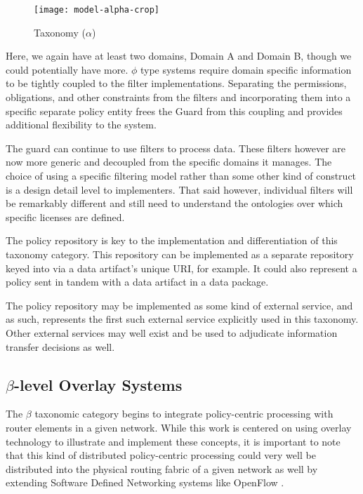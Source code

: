 \begin{figure}[!t]
\centering
\texttt{[image: model-alpha-crop]}
\caption{Taxonomy ($\alpha$)}
\label{fig:model:taxonomy-alpha}
\end{figure}

Here, we again have at least two domains, Domain A and Domain B, though we could potentially have more.  $\phi$ type systems require domain specific information to be tightly coupled to the filter implementations.  Separating the permissions, obligations, and other constraints from the filters and incorporating them into a specific separate policy entity frees the Guard from this coupling and provides additional flexibility to the system.

The guard can continue to use filters to process data.  These filters however are now more generic and decoupled from the specific domains it manages.  The choice of using a specific filtering model rather than some other kind of construct is a design detail level to implementers.  That said however, individual filters will be remarkably different and still need to understand the ontologies over which specific licenses are defined.

The policy repository is key to the implementation and differentiation of this taxonomy category.  This repository can be implemented as a separate repository keyed into via a data artifact's unique URI, for example.  It could also represent a policy sent in tandem with a data artifact in a data package.

The policy repository may be implemented as some kind of external service, and as such, represents the first such external service explicitly used in this taxonomy.  Other external services may well exist and be used to adjudicate information transfer decisions as well.

\subsection{$\beta$-level Overlay Systems}
The $\beta$ taxonomic category begins to integrate policy-centric processing with router elements in a given network.  While this work is centered on using overlay technology to illustrate and implement these concepts, it is important to note that this kind of distributed policy-centric processing could very well be distributed into the physical routing fabric of a given network as well by extending Software Defined Networking systems like OpenFlow \cite{proposal:openflow}.


